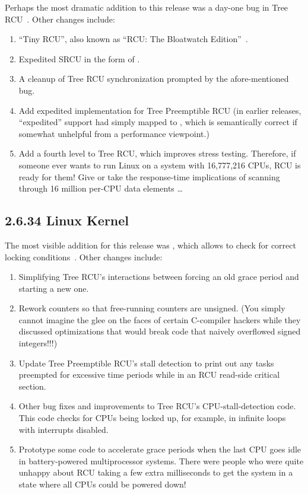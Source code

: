 Perhaps the most dramatic addition to this release was
a day-one bug in Tree RCU~\cite{PaulEMcKenney2009HuntingHeisenbugs}.
Other changes include:

\begin{enumerate}
\item	``Tiny RCU'', also known as ``RCU: The Bloatwatch
	Edition''~\cite{PaulEMcKenney2009LWNBloatWatchRCU}.
\item	Expedited SRCU in the form of
	.
\item	A cleanup of Tree RCU synchronization prompted by the
	afore-mentioned bug.
\item	Add expedited implementation for Tree Preemptible RCU
	(in earlier releases, ``expedited'' support had simply
	mapped to , which is semantically
	correct if somewhat unhelpful from a performance viewpoint.)
\item	Add a fourth level to Tree RCU, which improves stress testing.
	Therefore, if someone ever wants to run Linux on a system with
	16,777,216 CPUs, RCU is ready for them!
	Give or take the response-time implications of scanning
	through 16 million per-CPU data elements \ldots
\end{enumerate}

\subsection{2.6.34 Linux Kernel}

The most visible addition for this release was ,
which allows  to check for correct locking
conditions~\cite{PaulEMcKenney2010LockdepRCU}.
Other changes include:

\begin{enumerate}
\item	Simplifying Tree RCU's interactions between
	forcing an old grace period and starting a new one.
\item	Rework counters so that free-running counters are unsigned.
	(You simply cannot imagine the glee on the faces of certain
	C-compiler hackers while they discussed optimizations that would
	break code that naively overflowed signed integers!!!)
\item	Update Tree Preemptible RCU's stall detection to print out
	any tasks preempted for excessive time periods while in
	an RCU read-side critical section.
\item	Other bug fixes and improvements to Tree RCU's CPU-stall-detection
	code.
	This code checks for CPUs being locked up, for example,
	in infinite loops with interrupts disabled.
\item	Prototype some code to accelerate grace periods when the
	last CPU goes idle in battery-powered multiprocessor
	systems.
	There were people who were quite unhappy about RCU taking
	a few extra milliseconds to get the system in a state
	where all CPUs could be powered down!
\end{enumerate}

